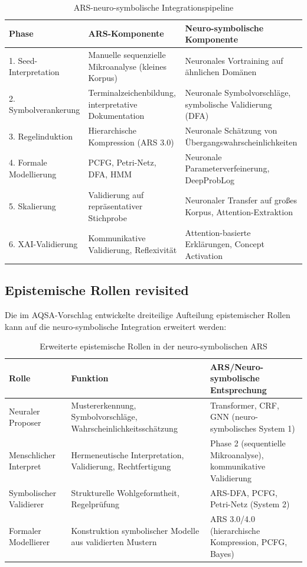 \documentclass[12pt,a4paper]{article}
\begin{document}
\begin{table}[H]
\centering
\caption{ARS-neuro-symbolische Integrationspipeline}
\label{tab:pipeline}
\begin{tabular}{@{} p{3cm} p{4cm} p{4cm} @{}}
\toprule
\textbf{Phase} & \textbf{ARS-Komponente} & \textbf{Neuro-symbolische Komponente} \\
\midrule
1. Seed-Interpretation & Manuelle sequenzielle Mikroanalyse (kleines Korpus) & Neuronales Vortraining auf ähnlichen Domänen \\
2. Symbolverankerung & Terminalzeichenbildung, interpretative Dokumentation & Neuronale Symbolvorschläge, symbolische Validierung (DFA) \\
3. Regelinduktion & Hierarchische Kompression (ARS 3.0) & Neuronale Schätzung von Übergangswahrscheinlichkeiten \\
4. Formale Modellierung & PCFG, Petri-Netz, DFA, HMM & Neuronale Parameterverfeinerung, DeepProbLog \\
5. Skalierung & Validierung auf repräsentativer Stichprobe & Neuronaler Transfer auf großes Korpus, Attention-Extraktion \\
6. XAI-Validierung & Kommunikative Validierung, Reflexivität & Attention-basierte Erklärungen, Concept Activation \\
\bottomrule
\end{tabular}
\end{table}

\subsection{Epistemische Rollen revisited}

Die im AQSA-Vorschlag entwickelte dreiteilige Aufteilung epistemischer Rollen 
\citep{koop2026aqsa} kann auf die neuro-symbolische Integration erweitert werden:

\begin{table}[H]
\centering
\caption{Erweiterte epistemische Rollen in der neuro-symbolischen ARS}
\label{tab:roles}
\begin{tabular}{@{} p{3cm} p{4cm} p{4cm} @{}}
\toprule
\textbf{Rolle} & \textbf{Funktion} & \textbf{ARS/Neuro-symbolische Entsprechung} \\
\midrule
Neuraler Proposer & Mustererkennung, Symbolvorschläge, Wahrscheinlichkeitsschätzung & Transformer, CRF, GNN (neuro-symbolisches System 1) \\
Menschlicher Interpret & Hermeneutische Interpretation, Validierung, Rechtfertigung & Phase 2 (sequentielle Mikroanalyse), kommunikative Validierung \\
Symbolischer Validierer & Strukturelle Wohlgeformtheit, Regelprüfung & ARS-DFA, PCFG, Petri-Netz (System 2) \\
Formaler Modellierer & Konstruktion symbolischer Modelle aus validierten Mustern & ARS 3.0/4.0 (hierarchische Kompression, PCFG, Bayes) \\
\bottomrule
\end{tabular}
\end{table}
\end{document}
